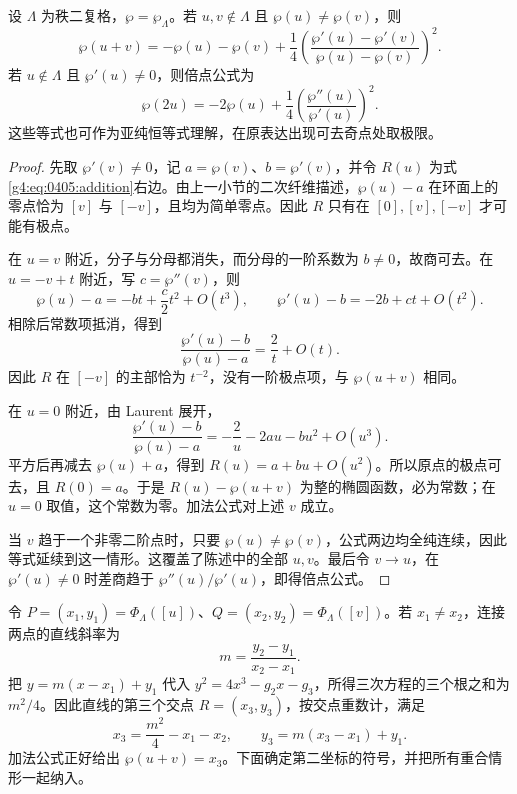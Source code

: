 \begin{theorem}\label{g4:thm:0405:addition}
	设 \(\Lambda\) 为秩二复格，\(\wp=\wp_\Lambda\)。若 \(u,v\notin\Lambda\) 且 \(\wp(u)\ne\wp(v)\)，则
	\begin{equation}\label{g4:eq:0405:addition}
		\wp(u+v)
		=-\wp(u)-\wp(v)
		+\frac14
		\left(\frac{\wp'(u)-\wp'(v)}{\wp(u)-\wp(v)}\right)^2.
	\end{equation}
	若 \(u\notin\Lambda\) 且 \(\wp'(u)\ne0\)，则倍点公式为
	\begin{equation}\label{g4:eq:0405:duplication}
		\wp(2u)=-2\wp(u)
		+\frac14\left(\frac{\wp''(u)}{\wp'(u)}\right)^2.
	\end{equation}
	这些等式也可作为亚纯恒等式理解，在原表达出现可去奇点处取极限。
\end{theorem}
\begin{proof}
	先取 \(\wp'(v)\ne0\)，记 \(a=\wp(v)\)、\(b=\wp'(v)\)，并令 \(R(u)\) 为式\eqref{g4:eq:0405:addition}右边。由上一小节的二次纤维描述，\(\wp(u)-a\) 在环面上的零点恰为 \([v]\) 与 \([-v]\)，且均为简单零点。因此 \(R\) 只有在 \([0],[v],[-v]\) 才可能有极点。

	在 \(u=v\) 附近，分子与分母都消失，而分母的一阶系数为 \(b\ne0\)，故商可去。在 \(u=-v+t\) 附近，写 \(c=\wp''(v)\)，则
	\[
		\wp(u)-a=-bt+\frac c2t^2+O(t^3),\qquad
		\wp'(u)-b=-2b+ct+O(t^2).
	\]
	相除后常数项抵消，得到
	\[
		\frac{\wp'(u)-b}{\wp(u)-a}=\frac2t+O(t).
	\]
	因此 \(R\) 在 \([-v]\) 的主部恰为 \(t^{-2}\)，没有一阶极点项，与 \(\wp(u+v)\) 相同。

	在 \(u=0\) 附近，由 Laurent 展开，
	\[
		\frac{\wp'(u)-b}{\wp(u)-a}
		=-\frac2u-2au-bu^2+O(u^3).
	\]
	平方后再减去 \(\wp(u)+a\)，得到 \(R(u)=a+bu+O(u^2)\)。所以原点的极点可去，且 \(R(0)=a\)。于是 \(R(u)-\wp(u+v)\) 为整的椭圆函数，必为常数；在 \(u=0\) 取值，这个常数为零。加法公式对上述 \(v\) 成立。

	当 \(v\) 趋于一个非零二阶点时，只要 \(\wp(u)\ne\wp(v)\)，公式两边均全纯连续，因此等式延续到这一情形。这覆盖了陈述中的全部 \(u,v\)。最后令 \(v\to u\)，在 \(\wp'(u)\ne0\) 时差商趋于 \(\wp''(u)/\wp'(u)\)，即得倍点公式。
\end{proof}

令 \(P=(x_1,y_1)=\Phi_\Lambda([u])\)、\(Q=(x_2,y_2)=\Phi_\Lambda([v])\)。若 \(x_1\ne x_2\)，连接两点的直线斜率为
\[
	m=\frac{y_2-y_1}{x_2-x_1}.
\]
把 \(y=m(x-x_1)+y_1\) 代入 \(y^2=4x^3-g_2x-g_3\)，所得三次方程的三个根之和为 \(m^2/4\)。因此直线的第三个交点 \(R=(x_3,y_3)\)，按交点重数计，满足
\[
	x_3=\frac{m^2}{4}-x_1-x_2,\qquad
	y_3=m(x_3-x_1)+y_1.
\]
加法公式正好给出 \(\wp(u+v)=x_3\)。下面确定第二坐标的符号，并把所有重合情形一起纳入。

